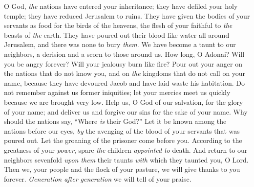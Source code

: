 \begin{biblechapter} %
 O God, \textit{the} nations have entered your inheritance; 
they have defiled your holy temple; 
they have reduced Jerusalem to ruins.
\verse They have given the bodies of your servants 
as food for the birds of the heavens, 
the flesh of your faithful to \textit{the} beasts of \textit{the} earth.
\verse They have poured out their blood like water 
all around Jerusalem, 
and there was none to bury \textit{them}.
\verse We have become a taunt to our neighbors, 
a derision and a scorn to those around us.
\verse How long, O Adonai? Will you be angry forever? 
Will your jealousy burn like fire?
\verse Pour out your anger on the nations 
that do not know you, 
and on \textit{the} kingdoms 
that do not call on your name,
\verse because they have devoured Jacob 
and have laid waste his habitation.
\verse Do not remember against us former iniquities; 
let your mercies meet us quickly 
because we are brought very low.
\verse Help us, O God of our salvation, 
for the glory of your name; 
and deliver us and forgive our sins 
for the sake of your name.
\verse Why should the nations say, 
“Where \textit{is} their God?” 
Let it be known among the nations before our eyes, 
\textit{by} the avenging of the blood of your servants 
that was poured out.
\verse Let the groaning of the prisoner come before you. 
According to the greatness of your \textit{power}, 
spare \textit{the} children \textit{appointed to} death.
\verse And return to our neighbors sevenfold \textit{upon them} 
their taunts \textit{with} which they taunted you, O Lord.
\verse Then we, your people and the flock of your pasture, 
we will give thanks to you forever. 
\textit{Generation after generation} 
we will tell of your praise.
\end{biblechapter}

